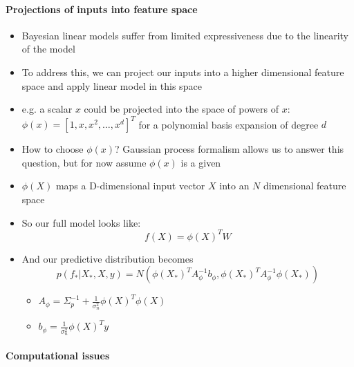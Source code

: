 \documentclass[12pt]{article}
\begin{document}
\paragraph{Projections of inputs into feature space}
\begin{itemize}
    \item Bayesian linear models suffer from limited expressiveness due to the linearity of the model
    \item To address this, we can project our inputs into a higher dimensional feature space and apply linear model in this space
    \item e.g. a scalar $x$ could be projected into the space of powers of $x$: $\phi(x) = [1, x, x^2, \ldots, x^d]^T$ for a polynomial basis expansion of degree $d$
    \item How to choose $\phi(x)$? Gaussian process formalism allows us to answer this question, but for now assume $\phi(x)$ is a given
    \item $\phi(X)$ maps a D-dimensional input vector $X$ into an $N$ dimensional feature space
    \item So our full model looks like:
\begin{equation}
    f(X) = \phi(X)^T W
\end{equation}
    \item And our predictive distribution becomes
\begin{equation}
    p(f_*|X_*,X,y) = N(\phi(X_*)^TA_{\phi}^{-1}b_{\phi} , \phi(X_*)^TA_{\phi}^{-1}\phi(X_*))
\end{equation}
    \begin{itemize}
        \item $A_{\phi} = \Sigma_p^{-1} + \frac{1}{\sigma^2_n}\phi(X)^T\phi(X)$
        \item $b_{\phi} = \frac{1}{\sigma^2_n}\phi(X)^Ty$
    \end{itemize}
\end{itemize}


\paragraph{Computational issues}
\end{document}
